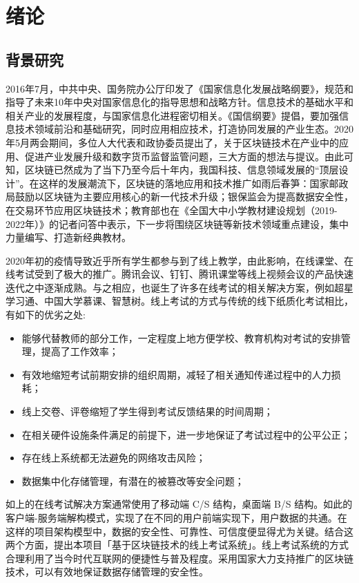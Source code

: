 \section{绪论}
\subsection{背景研究}
2016年7月，中共中央、国务院办公厅印发了《国家信息化发展战略纲要》，规范和指导了未来10年中央对国家信息化的指导思想和战略方针。信息技术的基础水平和相关产业的发展程度，与国家信息化进程密切相关。《国信纲要》提倡，要加强信息技术领域前沿和基础研究，同时应用相应技术，打造协同发展的产业生态。2020年5月两会期间，多位人大代表和政协委员提出了，关于区块链技术在产业中的应用、促进产业发展升级和数字货币监督监管问题，三大方面的想法与提议。由此可知，区块链已然成为了当下乃至今后十年内，我国科技、信息领域发展的“顶层设计”。在这样的发展潮流下，区块链的落地应用和技术推广如雨后春笋：国家邮政局鼓励以区块链为主要应用核心的新一代技术升级；银保监会为提高数据安全性，在交易环节应用区块链技术；教育部也在《全国大中小学教材建设规划（2019-2022年）》的记者问答中表示，下一步将围绕区块链等新技术领域重点建设，集中力量编写、打造新经典教材。

2020年初的疫情导致近乎所有学生都参与到了线上教学，由此影响，在线课堂、在线考试受到了极大的推广。腾讯会议、钉钉、腾讯课堂等线上视频会议的产品快速迭代之中逐渐成熟。与之相应，也诞生了许多在线考试的相关解决方案，例如超星学习通、中国大学慕课、智慧树。线上考试的方式与传统的线下纸质化考试相比，有如下的优劣之处:

\begin{itemize}
    \item 能够代替教师的部分工作，一定程度上地方便学校、教育机构对考试的安排管理，提高了工作效率；
    \item 有效地缩短考试前期安排的组织周期，减轻了相关通知传递过程中的人力损耗；
    \item 线上交卷、评卷缩短了学生得到考试反馈结果的时间周期；
    \item 在相关硬件设施条件满足的前提下，进一步地保证了考试过程中的公平公正；
    \item 存在线上系统都无法避免的网络攻击风险；
    \item 数据集中化存储管理，有潜在的被篡改等安全问题；
\end{itemize}

如上的在线考试解决方案通常使用了移动端 C/S 结构，桌面端 B/S 结构。如此的客户端-服务端解构模式，实现了在不同的用户前端实现下，用户数据的共通。在这样的项目架构模型中，数据的安全性、可靠性、可信度便显得尤为关键。结合这两个方面，提出本项目「基于区块链技术的线上考试系统」。线上考试系统的方式合理利用了当今时代互联网的便捷性与普及程度。采用国家大力支持推广的区块链技术，可以有效地保证数据存储管理的安全性。

